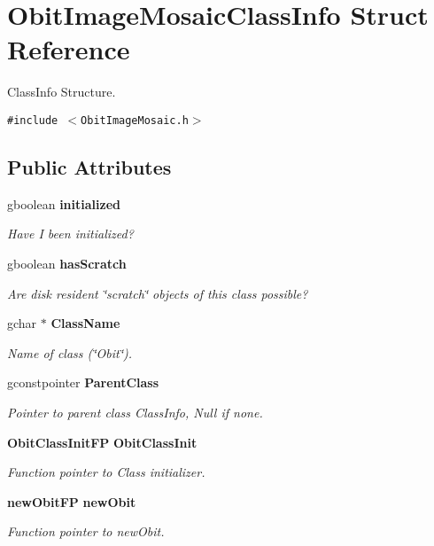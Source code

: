 \section{Obit\-Image\-Mosaic\-Class\-Info Struct Reference}
\label{structObitImageMosaicClassInfo}
Class\-Info Structure.  


{\tt \#include $<$Obit\-Image\-Mosaic.h$>$}

\subsection*{Public Attributes}
\begin{CompactItemize}
\item 
gboolean {\bf initialized}
\begin{CompactList}\small\item\em Have I been initialized? \item\end{CompactList}\item 
gboolean {\bf has\-Scratch}
\begin{CompactList}\small\item\em Are disk resident \char`\"{}scratch\char`\"{} objects of this class possible? \item\end{CompactList}\item 
gchar $\ast$ {\bf Class\-Name}
\begin{CompactList}\small\item\em Name of class (\char`\"{}Obit\char`\"{}). \item\end{CompactList}\item 
gconstpointer {\bf Parent\-Class}
\begin{CompactList}\small\item\em Pointer to parent class Class\-Info, Null if none. \item\end{CompactList}\item 
{\bf Obit\-Class\-Init\-FP} {\bf Obit\-Class\-Init}
\begin{CompactList}\small\item\em Function pointer to Class initializer. \item\end{CompactList}\item 
{\bf new\-Obit\-FP} {\bf new\-Obit}
\begin{CompactList}\small\item\em Function pointer to new\-Obit. \item\end{CompactList}\item 

\end{CompactItemize}
